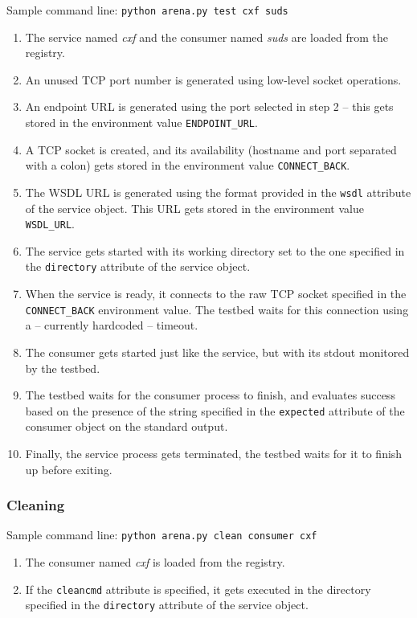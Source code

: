 Sample command line: \verb|python arena.py test cxf suds|

\begin{enumerate}
 \item The service named \emph{cxf} and the consumer named \emph{suds} are loaded from the registry.
 \item An unused TCP port number is generated using low-level socket operations.
 \item An endpoint URL is generated using the port selected in step 2 -- this gets stored in the environment value \verb|ENDPOINT_URL|.
 \item A TCP socket is created, and its availability (hostname and port separated with a colon) gets stored in the environment value \verb|CONNECT_BACK|.
 \item The WSDL URL is generated using the format provided in the \verb|wsdl| attribute of the service object. This URL gets stored in the environment value \verb|WSDL_URL|.
 \item The service gets started with its working directory set to the one specified in the \verb|directory| attribute of the service object.
 \item When the service is ready, it connects to the raw TCP socket specified in the \verb|CONNECT_BACK| environment value. The testbed waits for this connection using a -- currently hardcoded -- timeout.
 \item The consumer gets started just like the service, but with its stdout monitored by the testbed.
 \item The testbed waits for the consumer process to finish, and evaluates success based on the presence of the string specified in the \verb|expected| attribute of the consumer object on the standard output.
 \item Finally, the service process gets terminated, the testbed waits for it to finish up before exiting.
\end{enumerate}

\subsubsection{Cleaning}

Sample command line: \verb|python arena.py clean consumer cxf|

\begin{enumerate}
 \item The consumer named \emph{cxf} is loaded from the registry.
 \item If the \verb|cleancmd| attribute is specified, it gets executed in the directory specified in the \verb|directory| attribute of the service object.
\end{enumerate}

